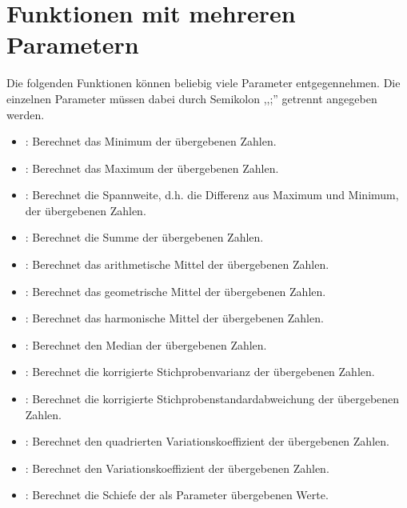 \chapter{Funktionen mit mehreren Parametern}

Die folgenden Funktionen können beliebig viele Parameter entgegennehmen.
Die einzelnen Parameter müssen dabei durch Semikolon ,,;'' getrennt
angegeben werden.

\begin{itemize}

\item
{}:
Berechnet das Minimum der übergebenen Zahlen.

\item
{}:
Berechnet das Maximum der übergebenen Zahlen.

\item
{}:
Berechnet die Spannweite, d.h. die Differenz aus Maximum und Minimum, der übergebenen Zahlen.

\item
{}:
Berechnet die Summe der übergebenen Zahlen.

\item
{}:
Berechnet das arithmetische Mittel der übergebenen Zahlen.

\item
{}:
Berechnet das geometrische Mittel der übergebenen Zahlen.

\item
{}:
Berechnet das harmonische Mittel der übergebenen Zahlen.

\item
{}:
Berechnet den Median der übergebenen Zahlen.

\item
{}:
Berechnet die korrigierte Stichprobenvarianz der übergebenen Zahlen.

\item
{}:
Berechnet die korrigierte Stichprobenstandardabweichung der übergebenen Zahlen.

\item
{}:
Berechnet den quadrierten Variationskoeffizient der übergebenen Zahlen.

\item
{}:
Berechnet den Variationskoeffizient der übergebenen Zahlen.

\item
{}:
Berechnet die Schiefe der als Parameter übergebenen Werte.


\end{itemize}
